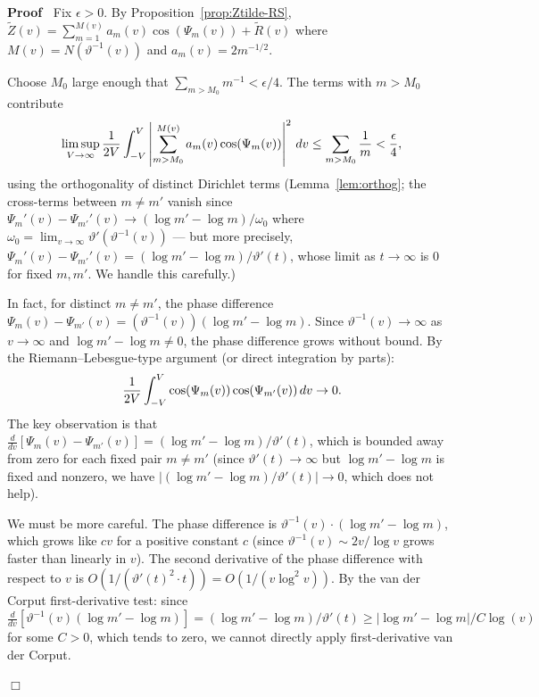 \documentclass{article}
\newcommand{\tmtextbf}[1]{\text{{\bfseries{#1}}}}
\newenvironment{proof}{\noindent\textbf{Proof\ }}{\hspace*{\fill}$\Box$\medskip}
\begin{document}
\begin{proof}
  Fix $\epsilon > 0$. By Proposition~\ref{prop:Ztilde-RS}, $\tilde{Z} (v) =
  \sum_{m = 1}^{M (v)} a_m (v) \cos (\Psi_m (v)) + \tilde{R} (v)$ where $M (v)
  = N (\vartheta^{- 1} (v))$ and $a_m (v) = 2 m^{- 1 / 2}$.
  
  \tmtextbf{Step 1: Truncation.} Choose $M_0$ large enough that $\sum_{m >
  M_0} m^{- 1} < \epsilon / 4$. The terms with $m > M_0$ contribute
  \[ \limsup_{V \to \infty}  \frac{1}{2 V}  \int_{- V}^V \left| \sum_{m >
     M_0}^{M (v)} a_m (v) \cos (\Psi_m (v)) \right|^2  \hspace{0.17em} dv \le
     \sum_{m > M_0} \frac{1}{m} < \frac{\epsilon}{4}, \]
  using the orthogonality of distinct Dirichlet terms (Lemma~\ref{lem:orthog};
  the cross-terms between $m \ne m'$ vanish since $\Psi_m' (v) - \Psi_{m'}'
  (v) \to (\log m' - \log m) / \omega_0$ where $\omega_0 = \lim_{v \to \infty}
  \vartheta' (\vartheta^{- 1} (v))$ --- but more precisely, $\Psi_m' (v) -
  \Psi_{m'}' (v) = (\log m' - \log m) / \vartheta' (t)$, whose limit as $t \to
  \infty$ is $0$ for fixed $m, m'$. We handle this carefully.)
  
  In fact, for distinct $m \ne m'$, the phase difference $\Psi_m (v) -
  \Psi_{m'} (v) = (\vartheta^{- 1} (v))  (\log m' - \log m)$. Since
  $\vartheta^{- 1} (v) \to \infty$ as $v \to \infty$ and $\log m' - \log m \ne
  0$, the phase difference grows without bound. By the Riemann--Lebesgue-type
  argument (or direct integration by parts):
  \[ \frac{1}{2 V}  \int_{- V}^V \cos (\Psi_m (v)) \cos (\Psi_{m'} (v)) 
     \hspace{0.17em} dv \to 0. \]
  The key observation is that $\frac{d}{dv}  [\Psi_m (v) - \Psi_{m'} (v)] =
  (\log m' - \log m) / \vartheta' (t)$, which is bounded away from zero for
  each fixed pair $m \ne m'$ (since $\vartheta' (t) \to \infty$ but $\log m' -
  \log m$ is fixed and nonzero, we have $| (\log m' - \log m) / \vartheta' (t)
  | \to 0$, which does not help).
  
  We must be more careful. The phase difference is $\vartheta^{- 1} (v) \cdot
  (\log m' - \log m)$, which grows like $cv$ for a positive constant $c$
  (since $\vartheta^{- 1} (v) \sim 2 v / \log v$ grows faster than linearly in
  $v$). The second derivative of the phase difference with respect to $v$ is
  $O (1 / (\vartheta' (t)^2 \cdot t)) = O (1 / (v \log^2 v))$. By the van der
  Corput first-derivative test: since $\frac{d}{dv}  [\vartheta^{- 1} (v)
  (\log m' - \log m)] = (\log m' - \log m) / \vartheta' (t) \ge | \log m' -
  \log m| / C \log (v)$ for some $C > 0$, which tends to zero, we cannot
  directly apply first-derivative van der Corput.
  

\end{proof}
\end{document}
